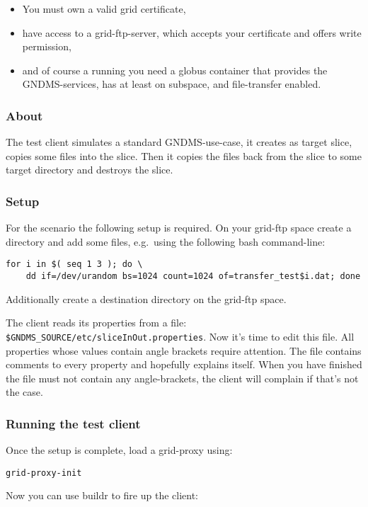 \documentclass{article}
\begin{document}
\begin{itemize}
\item
  You must own a valid grid certificate,
\item
  have access to a grid-ftp-server, which accepts your certificate
  and offers write permission,
\item
  and of course a running you need a globus container that provides the
  GNDMS-services, has at least on subspace, and file-transfer
  enabled.
\end{itemize}
\subsubsection{About}

The test client simulates a standard GNDMS-use-case, it creates as
target slice, copies some files into the slice. Then it copies the
files back from the slice to some target directory and destroys the
slice.

\subsubsection{Setup}

For the scenario the following setup is required. On your grid-ftp
space create a directory and add some files, e.g.~using the
following bash command-line:

\begin{verbatim}
for i in $( seq 1 3 ); do \
    dd if=/dev/urandom bs=1024 count=1024 of=transfer_test$i.dat; done
\end{verbatim}

Additionally create a destination directory on the grid-ftp space.

The client reads its properties from a file:
\verb!$GNDMS_SOURCE/etc/sliceInOut.properties!. Now it's time to
edit this file. All properties whose values contain angle brackets
require attention. The file contains comments to every property and
hopefully explains itself. When you have finished the file must not
contain any angle-brackets, the client will complain if that's not
the case.

\subsubsection{Running the test client}

Once the setup is complete, load a grid-proxy using:

\begin{verbatim}
grid-proxy-init
\end{verbatim}
Now you can use buildr to fire up the client:
\end{document}
